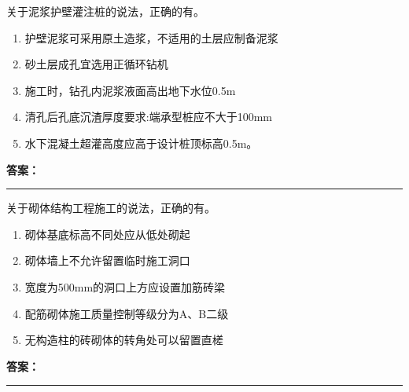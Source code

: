 \documentclass[UTF8,fontset=fandol,11pt]{ctexart}
\newcommand{\answerline}{\textcolor{answerred}{\rule{2.4cm}{0.7pt}}}
\begin{document}
\begin{quizbox}[title={乱序第 131 题｜第二章桩基础工程}]

关于泥浆护壁灌注桩的说法，正确的有。\\

\begin{enumerate}[label=\Alph*.]

\item 护壁泥浆可采用原土造浆，不适用的土层应制备泥浆

\item 砂土层成孔宜选用正循环钻机

\item 施工时，钻孔内泥浆液面高出地下水位0.5m

\item 清孔后孔底沉渣厚度要求:端承型桩应不大于100mm

\item 水下混凝土超灌高度应高于设计桩顶标高0.5m。

\end{enumerate}

\textbf{\textcolor{answerred}{答案：}} \answerline

\end{quizbox}

\vspace{0.2em}

\begin{quizbox}[title={乱序第 132 题｜第六章砌筑工程}]

关于砌体结构工程施工的说法，正确的有。\\

\begin{enumerate}[label=\Alph*.]

\item 砌体基底标高不同处应从低处砌起

\item 砌体墙上不允许留置临时施工洞口

\item 宽度为500mm的洞口上方应设置加筋砖梁

\item 配筋砌体施工质量控制等级分为A、B二级

\item 无构造柱的砖砌体的转角处可以留置直槎

\end{enumerate}

\textbf{\textcolor{answerred}{答案：}} \answerline

\end{quizbox}
\end{document}

